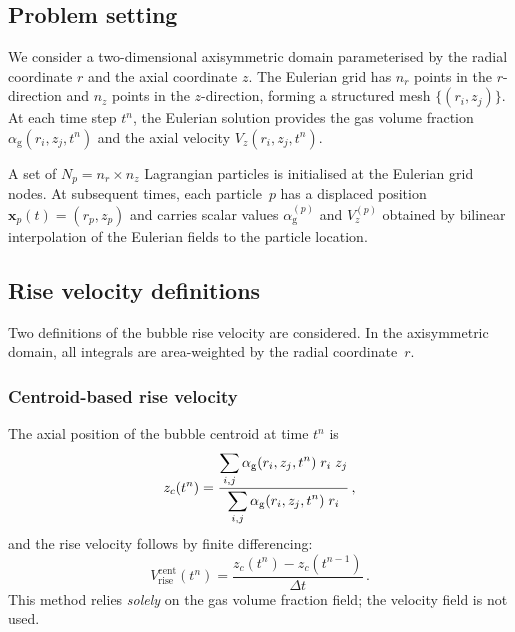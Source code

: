 \documentclass[11pt,a4paper]{article}
\newcommand{\alphag}{\alpha_{\mathrm{g}}}
\newcommand{\Vz}{V_z}
\begin{document}
\subsection{Problem setting}

We consider a two-dimensional axisymmetric domain parameterised by the
radial coordinate $r$ and the axial coordinate $z$.  The Eulerian grid has
$n_r$ points in the $r$-direction and $n_z$ points in the $z$-direction,
forming a structured mesh $\{(r_i, z_j)\}$.  At each time step $t^n$, the
Eulerian solution provides the gas volume fraction
$\alphag(r_i,z_j,t^n)$ and the axial velocity $\Vz(r_i,z_j,t^n)$.

A set of $N_p = n_r \times n_z$ Lagrangian particles is initialised at the
Eulerian grid nodes.  At subsequent times, each particle~$p$ has a displaced
position $\bm{x}_p(t) = (r_p, z_p)$ and carries scalar values
$\alphag^{(p)}$ and $\Vz^{(p)}$ obtained by bilinear interpolation of the
Eulerian fields to the particle location.


\subsection{Rise velocity definitions}
\label{sec:rise_vel_defs}

Two definitions of the bubble rise velocity are considered.  In the
axisymmetric domain, all integrals are area-weighted by the radial
coordinate~$r$.

\subsubsection{Centroid-based rise velocity}
\label{sec:centroid}

The axial position of the bubble centroid at time $t^n$ is
\begin{equation}\label{eq:centroid_euler}
  z_c(t^n) = \frac{%
    \displaystyle\sum_{i,j}
      \alphag(r_i,z_j,t^n)\; r_i\; z_j
  }{%
    \displaystyle\sum_{i,j}
      \alphag(r_i,z_j,t^n)\; r_i
  }\,,
\end{equation}
and the rise velocity follows by finite differencing:
\begin{equation}\label{eq:vrise_centroid}
  V_{\mathrm{rise}}^{\mathrm{cent}}(t^n)
  = \frac{z_c(t^n) - z_c(t^{n-1})}{\Delta t}\,.
\end{equation}
This method relies \emph{solely} on the gas volume fraction field; the
velocity field is not used.
\end{document}
